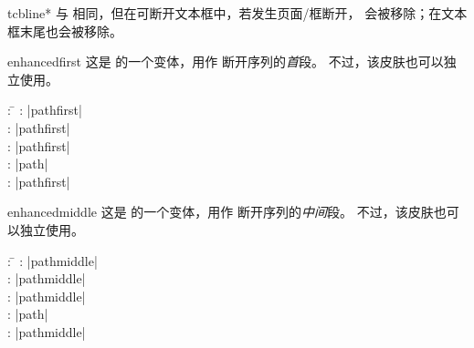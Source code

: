 \begin{docCommand}{tcbline*}{}
  与  相同，但在可断开文本框中，若发生页面/框断开，
   会被移除；在文本框末尾也会被移除。
\end{docCommand}

\clearpage
\begin{docSkin}{enhancedfirst}
这是  的一个变体，用作  断开序列的\emph{首}段。
不过，该皮肤也可以独立使用。
\begin{tcolorbox}[skintable=enhancedfirst]
  \begin{tabbing}
    : \=\kill
    :           \> |pathfirst|\\
    : \> |pathfirst|\\ 
    :        \> |pathfirst|\\
    :    \> |path|\\
    :           \> |pathfirst|
  \end{tabbing}
\end{tcolorbox}
\end{docSkin}


\begin{dispExample}
\end{dispExample}

\medskip

\begin{docSkin}{enhancedmiddle}
这是  的一个变体，用作  断开序列的\emph{中间}段。
不过，该皮肤也可以独立使用。
\begin{tcolorbox}[skintable=enhancedmiddle]
  \begin{tabbing}
    : \=\kill
    :           \> |pathmiddle|\\
    : \> |pathmiddle|\\ 
    :        \> |pathmiddle|\\
    :    \> |path|\\
    :           \> |pathmiddle|
  \end{tabbing}
\end{tcolorbox}
\end{docSkin}



